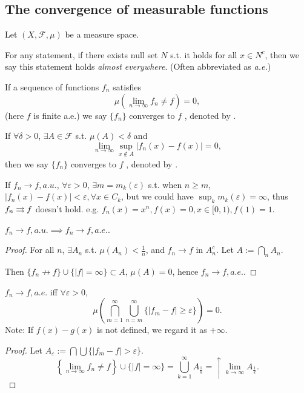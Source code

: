 \subsection{The convergence of measurable functions}
\label{sub:The convergence of measurable functions}

Let $(X, \mathscr{F}, \mu)$ be a measure space.

For any statement, if there exists null set $N$ s.t. it holds
for all $x\in N^c$, then we say this statement holds \textit{almost everywhere}.
(Often abbreviated as \textit{a.e.})

\begin{definition}
	If a sequence of functions $f_n$ satisfies
	\[
	\mu\left(\lim_{n\to \infty} f_n\ne f\right) = 0,
	\]
	(here $f$ is finite a.e.)
	we say $\{f_n\}$ converges to $f$ , denoted by
	.
\end{definition}

\begin{definition}
	If $\forall \delta>0$,  $\exists A\in \mathscr{F}$ s.t. $\mu(A)<\delta$ and
	\[
	\lim_{n\to \infty}\sup_{x\notin A}|f_n(x)-f(x)| = 0,
	\]
	then we say $\{f_n\}$ converges to $f$ ,
	denoted by .
\end{definition}

If $f_n\to f,a.u.$, $\forall \varepsilon>0$, $\exists m=m_k(\varepsilon)$ s.t.
when  $n\ge m$, $|f_n(x)-f(x)|<\varepsilon, \forall x\in C_k$, but
we could have $\sup_k m_k(\varepsilon) =  \infty$, thus $f_n\rightrightarrows f$ doesn't hold.
e.g. $f_n(x) = x^n, f(x) = 0, x\in [0,1), f(1)=1$.

\begin{proposition}
	$f_n\to f,a.u.\implies f_n\to f,a.e.$.
\end{proposition}
\begin{proof}[Proof]
    For all $n$, $\exists A_n$ s.t. $\mu(A_n)<\frac{1}{n}$, and $f_n\to f$
	in $A_n^c$. Let $A := \bigcap_n A_n$.

	Then $\{f_n\not\to f\}\cup \{|f|=\infty\} \subset A$, $\mu(A) = 0$,
	hence $f_n\to f, a.e.$.
\end{proof}

\begin{proposition}
	$f_n\to f, a.e.$ iff $\forall \varepsilon>0$,
	\[
	\mu\left(\bigcap_{m=1}^\infty \bigcup_{n=m}^\infty \{|f_m - f|\ge\varepsilon\}\right) = 0.
	\]
	Note: If $f(x)-g(x)$ is not defined, we regard it as $+\infty$.
\end{proposition}
\begin{proof}[Proof]
    Let $A_\varepsilon := \bigcap \bigcup \{|f_m-f|>\varepsilon\}$.
	\[
	\left\{\lim_{n\to \infty}f_n \ne f\right\}\cup \{|f|=\infty\}
	= \bigcup_{k=1}^\infty A_{\frac{1}{k}}
	= \uparrow \lim_{k\to \infty}A_{\frac{1}{k}}.
	\]
\end{proof}

